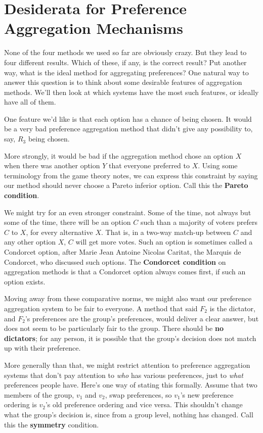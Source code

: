 \documentclass[11pt,]{article}
\begin{document}
\hypertarget{desiderata-for-preference-aggregation-mechanisms}{%
\section{Desiderata for Preference Aggregation
Mechanisms}\label{desiderata-for-preference-aggregation-mechanisms}}

None of the four methods we used so far are obviously crazy. But they
lead to four different results. Which of these, if any, is the correct
result? Put another way, what is the ideal method for aggregating
preferences? One natural way to answer this question is to think about
some desirable features of aggregation methods. We'll then look at which
systems have the most such features, or ideally have all of them.

One feature we'd like is that each option has a chance of being chosen.
It would be a very bad preference aggregation method that didn't give
any possibility to, say, \(R_3\) being chosen.

More strongly, it would be bad if the aggregation method chose an option
\(X\) when there was another option \(Y\) that everyone preferred to
\(X\). Using some terminology from the game theory notes, we can express
this constraint by saying our method should never choose a Pareto
inferior option. Call this the \textbf{Pareto condition}.

We might try for an even stronger constraint. Some of the time, not
always but some of the time, there will be an option \(C\) such than a
majority of voters prefers \(C\) to \(X\), for every alternative \(X\).
That is, in a two-way match-up between \(C\) and any other option \(X\),
\(C\) will get more votes. Such an option is sometimes called a
Condorcet option, after Marie Jean Antoine Nicolas Caritat, the Marquis
de Condorcet, who discussed such options. The \textbf{Condorcet
condition} on aggregation methods is that a Condorcet option always
comes first, if such an option exists.

Moving away from these comparative norms, we might also want our
preference aggregation system to be fair to everyone. A method that said
\(F_2\) is the dictator, and \(F_2\)'s preferences are the group's
preferences, would deliver a clear answer, but does not seem to be
particularly fair to the group. There should be \textbf{no dictators};
for any person, it is possible that the group's decision does not match
up with their preference.

More generally than that, we might restrict attention to preference
aggregation systems that don't pay attention to \emph{who} has various
preferences, just to \emph{what} preferences people have. Here's one way
of stating this formally. Assume that two members of the group, \(v_1\)
and \(v_2\), swap preferences, so \(v_1\)'s new preference ordering is
\(v_2\)'s old preference ordering and vice versa. This shouldn't change
what the group's decision is, since from a group level, nothing has
changed. Call this the \textbf{symmetry} condition.
\end{document}
